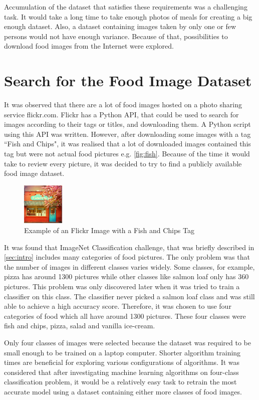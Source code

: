 Accumulation of the dataset that satisfies these requirements was a challenging task. It would take a long time to take enough photos of meals for creating a big enough dataset. Also, a dataset containing images taken by only one or few persons would not have enough variance. Because of that, possibilities to download food images from the Internet were explored.

\section{Search for the Food Image Dataset}

It was observed that there are a lot of food images hosted on a photo sharing service flickr.com. Flickr has a Python API, that could be used to search for images according to their tags or titles, and downloading them. A Python script using this API was written. However, after downloading some images with a tag ``Fish and Chips",  it was realised that a lot of downloaded images contained this tag but were not actual food pictures e.g. \autoref{fig:fish}. Because of the time it would take to review every picture, it was decided to try to find a publicly available food image dataset.  


\begin{figure}[ht]
\centering
\includegraphics[width=2cm]{Figures/c3/flick.jpg}
\caption{Example of an Flickr Image with a Fish and Chips Tag}
\label{fig:fish}
\end{figure}


It was found that ImageNet Classification challenge, that was briefly described in \autoref{sec:intro}  includes many categories of food pictures. The only problem was that the number of images in different classes varies widely. Some classes, for example, pizza has around 1300 pictures while other classes like salmon loaf only has  360 pictures. This problem was only discovered later when it was tried to train a classifier on this class. The classifier never picked a salmon loaf class and was still able to achieve a high accuracy score. Therefore, it was chosen to use four categories of food which all have around 1300 pictures. These four classes were fish and chips, pizza, salad and vanilla ice-cream. 


Only four classes of images were selected because the dataset was required to be small enough to be trained on a laptop computer. Shorter algorithm training times are beneficial for exploring various configurations of algorithms.  It was considered that after investigating machine learning algorithms on four-class classification problem, it would be a relatively easy task to retrain the most accurate model using a dataset containing either more classes of food images.

